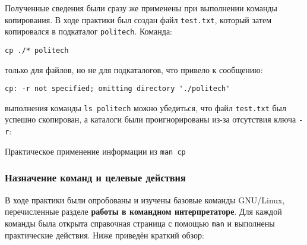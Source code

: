 Полученные сведения были сразу же применены при выполнении команды копирования. В ходе практики был создан файл \texttt{test.txt}, который затем копировался в подкаталог \texttt{politech}. Команда:

\begin{verbatim}
cp ./* politech
\end{verbatim}

 только для файлов, но не для подкаталогов, что привело к сообщению:

\begin{verbatim}
cp: -r not specified; omitting directory './politech'
\end{verbatim}

 выполнения команды \texttt{ls politech} можно убедиться, что файл \texttt{test.txt} был успешно скопирован, а каталоги были проигнорированы из-за отсутствия ключа \texttt{-r}:

{Практическое применение информации из \texttt{man cp}}

\subsubsection*{Назначение команд и целевые действия}

В ходе практики были опробованы и изучены базовые команды GNU/Linux, перечисленные разделе \textbf{ работы в командном интерпретаторе\frqq}. Для каждой команды была открыта справочная страница с помощью \texttt{man} и выполнены практические действия. Ниже приведён краткий обзор:

